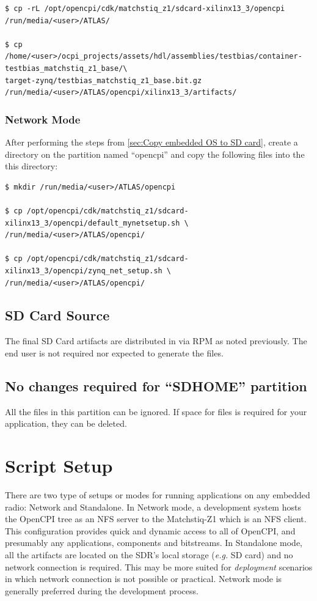 \begin{verbatim}
$ cp -rL /opt/opencpi/cdk/matchstiq_z1/sdcard-xilinx13_3/opencpi /run/media/<user>/ATLAS/

$ cp /home/<user>/ocpi_projects/assets/hdl/assemblies/testbias/container-testbias_matchstiq_z1_base/\
target-zynq/testbias_matchstiq_z1_base.bit.gz /run/media/<user>/ATLAS/opencpi/xilinx13_3/artifacts/
\end{verbatim}

\subsubsection{Network Mode}
After performing the steps from \ref{sec:Copy embedded OS to SD card}, create a directory on the partition named ``opencpi'' and copy the following files into the this directory:

\begin{verbatim}
$ mkdir /run/media/<user>/ATLAS/opencpi

$ cp /opt/opencpi/cdk/matchstiq_z1/sdcard-xilinx13_3/opencpi/default_mynetsetup.sh \
/run/media/<user>/ATLAS/opencpi/

$ cp /opt/opencpi/cdk/matchstiq_z1/sdcard-xilinx13_3/opencpi/zynq_net_setup.sh \
/run/media/<user>/ATLAS/opencpi/
\end{verbatim}

\subsection{SD Card Source}
The final SD Card artifacts are distributed in  via RPM as noted previously. The end user is not required nor expected to generate the files.

\subsection{No changes required for ``SDHOME'' partition}
All the files in this partition can be ignored. If space for files is required for your application, they can be deleted.


\pagebreak
\section{Script Setup}
There are two type of setups or modes for running applications on any embedded radio: Network and Standalone. In Network mode, a development system hosts the OpenCPI tree as an NFS server to the Matchstiq-Z1 which is an NFS client. This configuration provides quick and dynamic access to all of OpenCPI, and presumably any applications, components and bitstreams. In Standalone mode, all the artifacts are located on the SDR's local storage (\textit{e.g.} SD card) and no network connection is required. This may be more suited for \textit{deployment} scenarios in which network connection is not possible or practical. Network mode is generally preferred during the development process.

